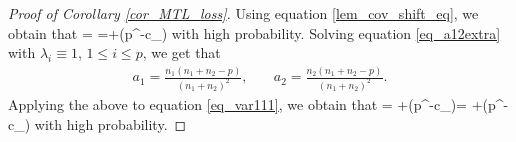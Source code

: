 \begin{proof}[Proof of Corollary \ref{cor_MTL_loss}]
Using equation \eqref{lem_cov_shift_eq}, we obtain that
\be\label{eq_var111} = \tr{}=+\OO(p^{-c_\varphi})\ee
with high probability. Solving equation \eqref{eq_a12extra} with $\lambda_i\equiv 1$, $1\le i\le p$, we get that  
	\begin{align}
		 a_1 = \frac{n_1(n_1 + n_2 - p)}{(n_1 + n_2)^2} ,\quad
		& a_2 = \frac{n_2(n_1 + n_2 - p)}{(n_1 +n_2)^2} . \label{simplesovlea12}
			\end{align}
Applying the above to equation \eqref{eq_var111}, we obtain that
\be\label{eq_var112}  =  \cdot {}+\OO(p^{-c_\varphi})=  +\OO(p^{-c_\varphi})\ee
with high probability. 


\end{proof}
